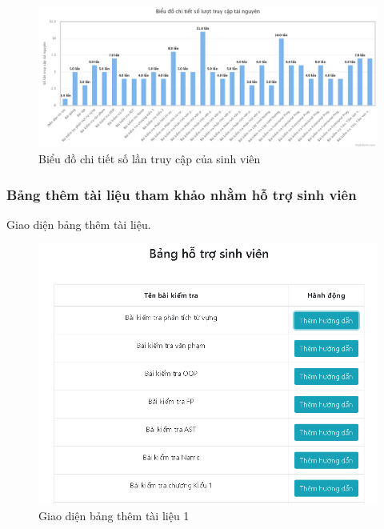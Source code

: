 \begin{center}
	\begin{figure}[htp]
		\begin{center}
			\includegraphics[width=1\linewidth]{img/42}
		\end{center}
		\caption{Biểu đồ chi tiết số lần truy cập của sinh viên}
		\label{refhinh69}
	\end{figure}
\end{center}

\newpage
\subsubsection{Bảng thêm tài liệu tham khảo nhằm hỗ trợ sinh viên}

Giao diện bảng thêm tài liệu.

\begin{center}
	\begin{figure}[htp]
		\begin{center}
			\includegraphics[width=0.6\linewidth]{img/30}
		\end{center}
		\caption{Giao diện bảng thêm tài liệu 1}
		\label{refhinh62}
	\end{figure}
\end{center}

